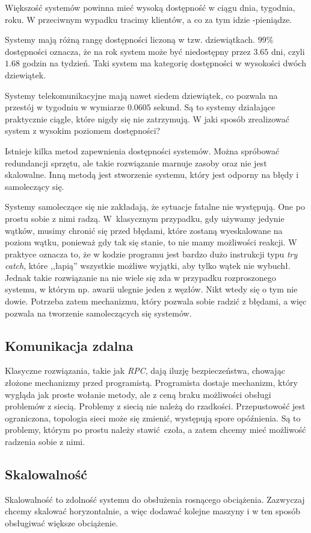 \documentclass[oneside, 12pt, a4paper]{article}
\begin{document}
\begin{multicols}{2}
Większość systemów powinna mieć wysoką dostępność w ciągu dnia, tygodnia, roku. W przeciwnym wypadku tracimy klientów, a co za tym idzie -pieniądze. 

Systemy mają różną rangę dostępności liczoną w tzw. dziewiątkach. $99\%$ dostępności oznacza, że na rok system może być niedostępny przez $3.65$ dni, czyli $1.68$ godzin na tydzień. Taki system ma kategorię dostępności w wysokości dwóch dziewiątek. 

Systemy telekomunikacyjne mają nawet siedem dziewiątek, co pozwala na przestój w tygodniu w wymiarze $0.0605$ sekund. Są to systemy działające praktycznie ciągle, które nigdy się nie zatrzymują. W jaki sposób zrealizować system z wysokim poziomem dostępności?

Istnieje kilka metod zapewnienia dostępności systemów. Można spróbować redundancji sprzętu, ale takie rozwiązanie marnuje zasoby oraz nie jest skalowalne. Inną metodą jest stworzenie systemu, który jest odporny na błędy i samoleczący się.

Systemy samoleczące się nie zakładają, że sytuacje fatalne nie występują. One po prostu sobie z nimi radzą. \mbox{W klasycznym} przypadku, gdy używamy jedynie wątków, musimy chronić się przed błędami, które zostaną wyeskalowane na poziom wątku, ponieważ gdy tak się stanie, to nie mamy możliwości reakcji. W praktyce oznacza to, że w kodzie programu jest bardzo dużo instrukcji typu \emph{try catch}, które ,,łapią'' wszystkie możliwe wyjątki, aby tylko wątek nie wybuchł. Jednak takie rozwiązanie na nie wiele się zda w przypadku rozproszonego systemu, w którym np. awarii ulegnie jeden z węzłów. Nikt wtedy się o tym nie dowie. Potrzeba zatem mechanizmu, który pozwala sobie radzić z błędami, a więc pozwala na tworzenie samoleczących się systemów.

\subsection{Komunikacja zdalna}
Klasyczne rozwiązania, takie jak \emph{RPC}, dają iluzję bezpieczeństwa, chowając złożone mechanizmy przed programistą. Programista dostaje mechanizm, który wygląda jak proste wołanie metody, ale z ceną braku możliwości obsługi problemów z siecią. Problemy z siecią nie należą do rzadkości. Przepustowość jest ograniczona, topologia sieci może się zmienić, występują spore opóźnienia. Są to problemy, którym po prostu należy stawić czoła, a zatem chcemy mieć możliwość radzenia sobie z nimi. 

\subsection{Skalowalność}
Skalowalność to zdolność systemu do obsłużenia rosnącego obciążenia. Zazwyczaj chcemy skalować horyzontalnie, a więc dodawać kolejne maszyny i w ten sposób obsługiwać większe obciążenie. 


\end{multicols}
\end{document}
